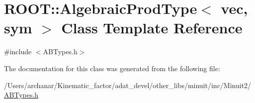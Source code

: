 \hypertarget{classROOT_1_1Minuit2_1_1AlgebraicProdType_3_01vec_00_01sym_01_4}{}\section{R\+O\+OT\+:\+:Algebraic\+Prod\+Type$<$ vec, sym $>$ Class Template Reference}
\label{classROOT_1_1Minuit2_1_1AlgebraicProdType_3_01vec_00_01sym_01_4}


{\ttfamily \#include $<$A\+B\+Types.\+h$>$}



The documentation for this class was generated from the following file\+:\begin{DoxyCompactItemize}
\item 
/\+Users/archanar/\+Kinematic\+\_\+factor/adat\+\_\+devel/other\+\_\+libs/minuit/inc/\+Minuit2/\mbox{\hyperlink{other__libs_2minuit_2inc_2Minuit2_2ABTypes_8h}{A\+B\+Types.\+h}}\end{DoxyCompactItemize}
